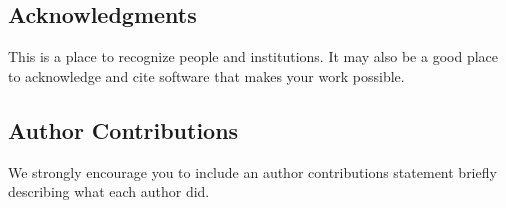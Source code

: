 \documentclass[fleqn,10pt,lineno]{wlpeerj} %
\begin{document}
\hypertarget{acknowledgments}{%
\subsection{Acknowledgments}\label{acknowledgments}}

This is a place to recognize people and institutions. It may also be a good place
to acknowledge and cite software that makes your work possible.

\hypertarget{author-contributions}{%
\subsection{Author Contributions}\label{author-contributions}}

We strongly encourage you to include an author contributions statement briefly
describing what each author did.
\end{document}
